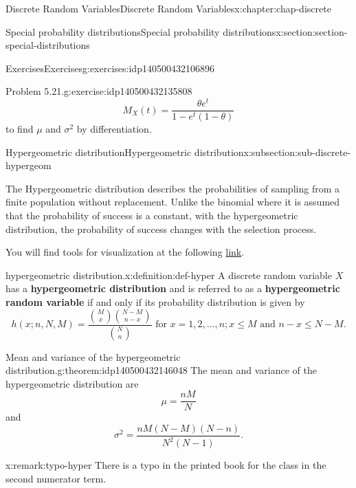 \documentclass[oneside,10pt,]{book}
\newcommand{\terminology}[1]{\textbf{#1}}
\begin{document}
\begin{chapterptx}{Discrete Random Variables}{}{Discrete Random Variables}{}{}{x:chapter:chap-discrete}
\begin{sectionptx}{Special probability distributions}{}{Special probability distributions}{}{}{x:section:section-special-distributions}
\begin{exercises-subsection}{Exercises}{}{Exercises}{}{}{g:exercises:idp140500432106896}
\begin{divisionexercise}{3}{Problem 5.21.}{}{g:exercise:idp140500432135808}
\begin{equation*}
M_X(t) = \dfrac{\theta
e^t}{1-e^t(1-\theta)}
\end{equation*}
to find \(\mu\) and \(\sigma^2\) by differentiation.%
\end{divisionexercise}%
\end{exercises-subsection}
%
%
\typeout{************************************************}
\typeout{************************************************}
%
\begin{subsectionptx}{Hypergeometric distribution}{}{Hypergeometric distribution}{}{}{x:subsection:sub-discrete-hypergeom}
\begin{introduction}{}%
The Hypergeometric distribution describes the probabilities of sampling from a finite population without replacement.  Unlike the binomial where it is assumed that the probability of success is a constant, with the hypergeometric distribution, the probability of success changes with the selection process.%
\par
You will find tools for visualization at the following \href{https://buddy.uco.edu/shiny/slaverty/mathstat/Hyper/}{link}.%
\end{introduction}%
\begin{definition}{hypergeometric distribution.}{x:definition:def-hyper}%
A discrete random variable \(\displaystyle X\) has a \terminology{hypergeometric distribution} and is referred to as a \terminology{hypergeometric random variable} if and only if its probability distribution is given by%
\begin{equation*}
h(x; n, N, M) = \dfrac{{M \choose x}{N-M
\choose{n-x}}}{{N \choose n}}
\text{ for }x = 1, 2, \dots, n; x \le M \text{ and } n-x \le N-M\text{.}
\end{equation*}
%
\end{definition}
\begin{theorem}{Mean and variance of the hypergeometric distribution.}{}{g:theorem:idp140500432146048}%
The mean and variance of the hypergeometric distribution are%
\begin{equation*}
\mu =
\frac{nM}{N}
\end{equation*}
and%
\begin{equation*}
\sigma^2 =
\frac{nM(N-M)(N-n)}{N^2(N-1)}\text{.}
\end{equation*}
%
\end{theorem}
\begin{remark}{}{x:remark:typo-hyper}%
There is a typo in the printed book for the class in the second numerator term.%

\end{remark}
\end{subsectionptx}
\end{sectionptx}
\end{chapterptx}
\end{document}
